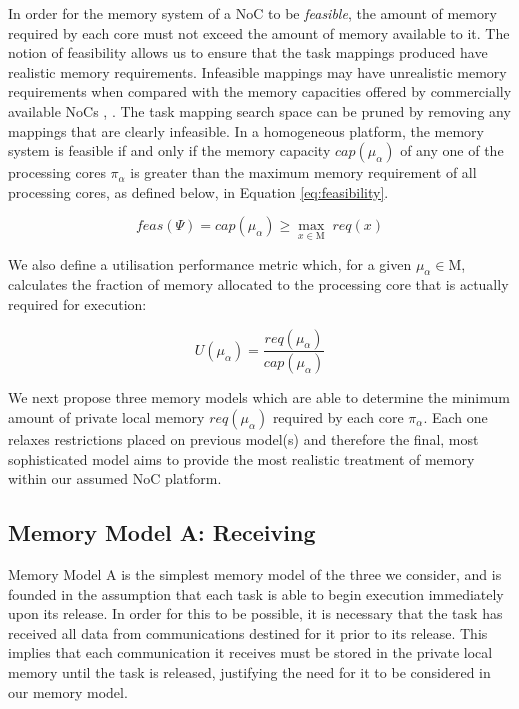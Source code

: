 \documentclass[10pt,conference]{IEEEtran}
\begin{document}
In order for the memory system of a NoC to be \textit{feasible}, the amount of memory required by each core must not exceed the amount of memory available to it. The notion of feasibility allows us to ensure that the task mappings produced have realistic memory requirements. Infeasible mappings may have unrealistic memory requirements when compared with the memory capacities offered by commercially available NoCs \cite{Dinechin14}, \cite{Agarwal07}. The task mapping search space can be pruned by removing any mappings that are clearly infeasible. In a homogeneous platform, the memory system is feasible if and only if the memory capacity $cap(\mu_\alpha)$ of any one of the processing cores $\pi_\alpha$ is greater than the maximum memory requirement of all processing cores, as defined below, in Equation \ref{eq:feasibility}.

\vspace{-2ex}
\begin{equation}
  \label{eq:feasibility}
  feas(\Psi) = cap(\mu_\alpha) \geq \max_{x \in \mathrm{M}}\phantom{.}{req(x)}
\end{equation}

We also define a utilisation performance metric which, for a given $\mu_\alpha \in \mathrm{M}$, calculates the fraction of memory allocated to the processing core that is actually required for execution:

\vspace{-0.5ex}
\begin{equation}
  \label{eq:memory-utilisation}
  U(\mu_\alpha) = \frac{req(\mu_\alpha)}{cap(\mu_\alpha)}
\end{equation}

We next propose three memory models which are able to determine the minimum amount of private local memory $req(\mu_\alpha)$ required by each core $\pi_\alpha$. Each one relaxes restrictions placed on previous model(s) and therefore the final, most sophisticated model aims to provide the most realistic treatment of memory within our assumed NoC platform.

\subsection{Memory Model A: Receiving}\label{sec:memory-model-a}

Memory Model A is the simplest memory model of the three we consider, and is founded in the assumption that each task is able to begin execution immediately upon its release. In order for this to be possible, it is necessary that the task has received all data from communications destined for it prior to its release. This implies that each communication it receives must be stored in the private local memory until the task is released, justifying the need for it to be considered in our memory model.
\end{document}

